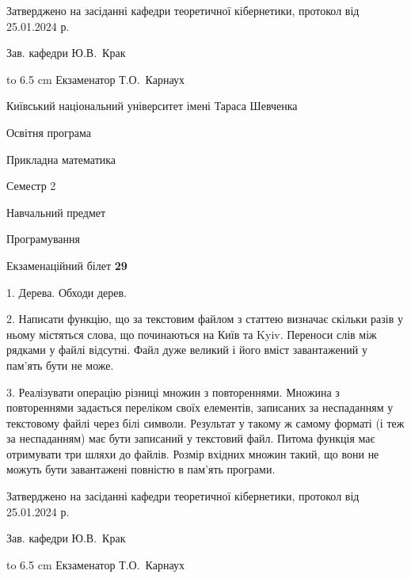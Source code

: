 \documentclass[12pt, ukrainian]{article}
\begin{document}
{\smallskip\smallskip \begin {scriptsize} Затверджено на засіданні кафедри теоретичної кібернетики, протокол   від   25.01.2024 р.\par\smallskip\smallskip\smallskip\smallskip
{\parbox {6.5 cm} {Зав. кафедри \dotfill Ю.В.~Крак}}\hspace {0.7cm} {\hbox to 6.5 cm { Екзаменатор \dotfill Т.О.~Карнаух}} \end{scriptsize}}
\vspace{0.9cm}
{{\begin {scriptsize}\par
{ \center  Київський національний університет імені Тараса Шевченка \par}
{\parbox {5 cm}{Освітня програма \hfill}{\parbox {7 cm}{Прикладна математика\hfill}}\parbox {6 cm}{\hfill Семестр 2}}\par
{\parbox {5 cm} {Навчальний предмет \hfill}\parbox {7 cm}{Програмування \hfill}\parbox {6cm}{\hfill}\par}\vspace{-15pt} \end{scriptsize}}{\center Екзаменаційний білет \No \textbf { 29 }\par}}
{%
1. Дерева. Обходи дерев.%
\par
2. Написати функцію, що за текстовим файлом з статтею визначає скільки разів у ньому містяться слова, що починаються на Київ та Kyiv.  Переноси слів між рядками у файлі відсутні. Файл дуже великий і його вміст завантажений у пам'ять бути не може.

\par
3. Реалізувати операцію різниці множин з повтореннями. Множина з повтореннями задається переліком своїх елементів, записаних за неспаданням у текстовому файлі через білі символи. Результат у такому ж самому форматі (і теж за неспаданням) має бути записаний у текстовий файл. Питома функція має отримувати три шляхи до файлів. Розмір вхідних множин такий, що вони не можуть бути завантажені повністю в пам’ять програми.

}
{\smallskip\smallskip \begin {scriptsize} Затверджено на засіданні кафедри теоретичної кібернетики, протокол   від   25.01.2024 р.\par\smallskip\smallskip\smallskip\smallskip
{\parbox {6.5 cm} {Зав. кафедри \dotfill Ю.В.~Крак}}\hspace {0.7cm} {\hbox to 6.5 cm { Екзаменатор \dotfill Т.О.~Карнаух}} \end{scriptsize}}
\end{document}
